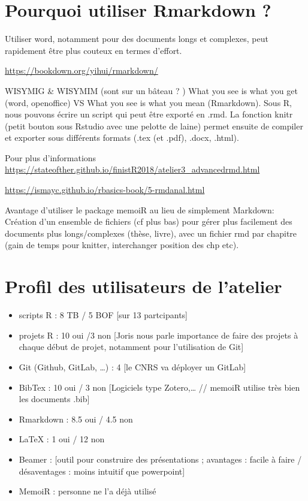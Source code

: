 \documentclass[
  12pt,
  american,
  a4paper,
  extrafontsizes,onecolumn,openright
  ]{memoir}
\providecommand{\tightlist}{%
  \setlength{\itemsep}{0pt}\setlength{\parskip}{0pt}}
\begin{document}
\hypertarget{pourquoi-utiliser-rmarkdown}{%
\section{Pourquoi utiliser Rmarkdown ?}\label{pourquoi-utiliser-rmarkdown}}

Utiliser word, notamment pour des documents longs et complexes, peut rapidement être plus couteux en termes d'effort.

\url{https://bookdown.org/yihui/rmarkdown/}

WISYMIG \& WISYMIM (sont sur un bâteau ? ) What you see is what you get (word, openoffice) VS What you see is what you mean (Rmarkdown). Sous R, nous pouvons écrire un script qui peut être exporté en .rmd. La fonction knitr (petit bouton sous Rstudio avec une pelotte de laine) permet ensuite de compiler et exporter sous différents formats (.tex (et .pdf), .docx, .html).

Pour plus d'informations \url{https://stateofther.github.io/finistR2018/atelier3_advancedrmd.html}

\url{https://ismayc.github.io/rbasics-book/5-rmdanal.html}

Avantage d'utiliser le package memoiR au lieu de simplement Markdown: Création d'un ensemble de fichiers (cf plus bas) pour gérer plus facilement des documents plus longs/complexes (thèse, livre), avec un fichier rmd par chapitre (gain de temps pour knitter, interchanger position des chp etc).

\hypertarget{profil-des-utilisateurs-de-latelier}{%
\section{Profil des utilisateurs de l'atelier}\label{profil-des-utilisateurs-de-latelier}}

\begin{itemize}
\tightlist
\item
  scripts R : 8 TB / 5 BOF {[}sur 13 partcipants{]}
\item
  projets R : 10 oui /3 non {[}Joris nous parle importance de faire des projets à chaque début de projet, notamment pour l'utilisation de Git{]}
\item
  Git (Github, GitLab, \ldots) : 4 {[}le CNRS va déployer un GitLab{]}
\item
  BibTex : 10 oui / 3 non {[}Logiciels type Zotero,\ldots{} // memoiR utilise très bien les documents .bib{]}
\item
  Rmarkdown : 8.5 oui / 4.5 non
\item
  LaTeX : 1 oui / 12 non
\item
  Beamer : {[}outil pour construire des présentations ; avantages : facile à faire / désaventages : moins intuitif que powerpoint{]}
\item
  MemoiR : personne ne l'a déjà utilisé
\end{itemize}
\end{document}
